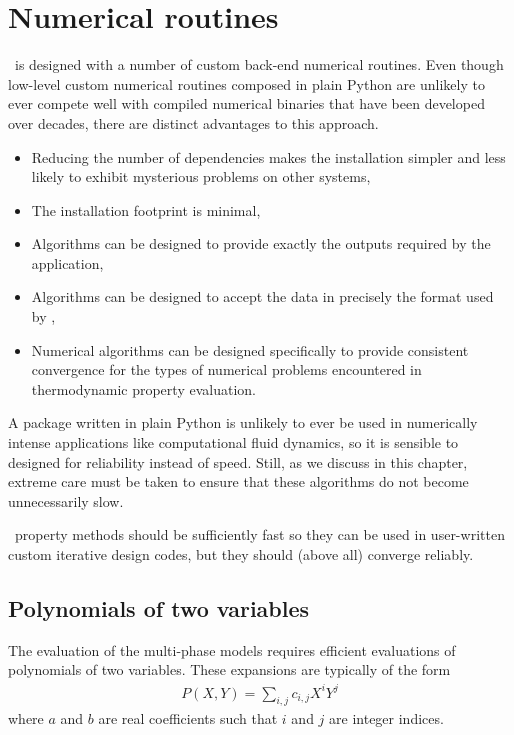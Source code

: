 \chapter{Numerical routines}\label{ch:num}

\PM\ is designed with a number of custom back-end numerical routines.  Even though low-level custom numerical routines composed in plain Python are unlikely to ever compete well with compiled numerical binaries that have been developed over decades, there are distinct advantages to this approach.
\begin{itemize}
\item Reducing the number of dependencies makes the installation simpler and less likely to exhibit mysterious problems on other systems,
\item The installation footprint is minimal,
\item Algorithms can be designed to provide exactly the outputs required by the application,
\item Algorithms can be designed to accept the data in precisely the format used by \PM,
\item Numerical algorithms can be designed specifically to provide consistent convergence for the types of numerical problems encountered in thermodynamic property evaluation.
\end{itemize}

A package written in plain Python is unlikely to ever be used in numerically intense applications like computational fluid dynamics, so it is sensible to designed for reliability instead of speed.  Still, as we discuss in this chapter, extreme care must be taken to ensure that these algorithms do not become unnecessarily slow.  

\PM\ property methods should be sufficiently fast so they can be used in user-written custom iterative design codes, but they should (above all) converge reliably.

%
%
\section{Polynomials of two variables}\label{sec:num:poly2}
The evaluation of the multi-phase models requires efficient evaluations of polynomials of two variables.  These expansions are typically of the form
\begin{align}
P(X,Y) = \sum_{i,j} c_{i,j} X^i Y^j\label{eqn:num:PXY}
\end{align}
where $a$ and $b$ are real coefficients such that $i$ and $j$ are integer indices. 

